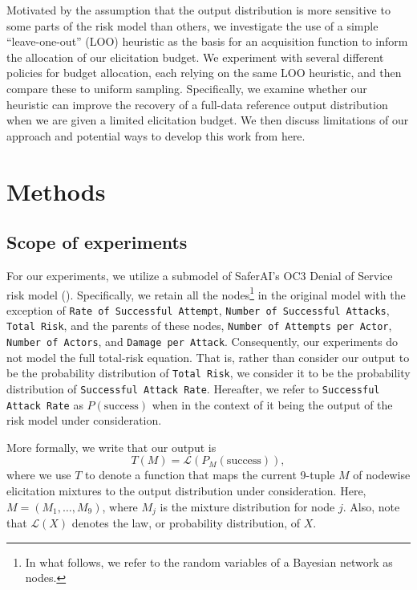 \documentclass[11pt]{article}
\newcommand{\psuccess}{P(\text{success})}
\newcommand{\law}{\mathcal{L}}
\begin{document}
Motivated by the assumption that the output distribution is more sensitive to some parts of the risk model than others, we investigate the use of a simple ``leave-one-out'' (LOO) heuristic as the basis for an acquisition function to inform the allocation of our elicitation budget. We experiment with several different policies for budget allocation, each relying on the same LOO heuristic, and then compare these to uniform sampling. Specifically, we examine whether our heuristic can improve the recovery of a full-data reference output distribution when we are given a limited elicitation budget. We then discuss limitations of our approach and potential ways to develop this work from here.

\section{Methods}
\subsection{Scope of experiments}
For our experiments, we utilize a submodel of SaferAI's OC3 Denial of Service risk model (\cite{barrett2025toward}). Specifically, we retain all the nodes\footnote{In what follows, we refer to the random variables of a Bayesian network as nodes.} in the original model with the exception of \texttt{Rate of Successful Attempt}, \texttt{Number of Successful Attacks}, \texttt{Total Risk}, and the parents of these nodes, \texttt{Number of Attempts per Actor}, \texttt{Number of Actors}, and \texttt{Damage per Attack}. Consequently, our experiments do not model the full total-risk equation. That is, rather than consider our output to be the probability distribution of \texttt{Total Risk}, we consider it to be the probability distribution of \texttt{Successful Attack Rate}. Hereafter, we refer to \texttt{Successful Attack Rate} as $\psuccess$ when in the context of it being the output of the risk model under consideration.

More formally, we write that our output is
\begin{equation} \label{output function}
    T(M)=\law\left(P_M(\mathrm{success})\right),
\end{equation}
where we use $T$ to denote a function that maps the current 9-tuple $M$ of nodewise elicitation mixtures to the output distribution under consideration. Here, $M = (M_1,\dots,M_9)$, where $M_j$ is the mixture distribution for node $j$. Also, note that $\law(X)$ denotes the law, or probability distribution, of $X$.
\end{document}
